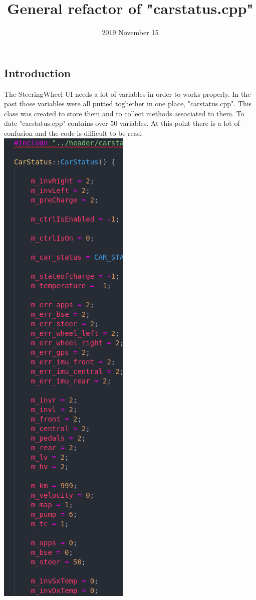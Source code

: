 \documentclass[12pt, letterpaper]{article}
\title{General refactor of "carstatus.cpp"}
\date{2019 November 15}
\begin{document}
\begin{titlepage}
\maketitle
\end{titlepage}

\begin{flushleft}

\section{Introduction}
	The SteeringWheel UI needs a lot of variables in order to works properly. In the past those variables were all putted toghether in one place, "carstatus.cpp". This class was created to store them and to collect methods associated to them. To date "carstatus.cpp" contains over 50 variables. At this point there is a lot of confusion and the code is difficult to be read.
\newline
\newline
\includegraphics[scale=1.5]{code.png}

\end{flushleft}
\end{document}
